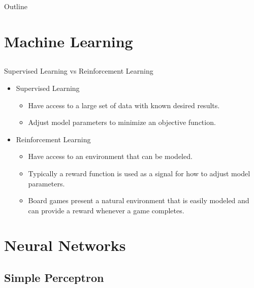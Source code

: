 


\begin{frame}[plain] 
\titlepage
\end{frame}

\begin{frame}[plain]{Outline}
\tableofcontents
\end{frame}

\section{Machine Learning}
\subsection{}

\begin{frame}{Supervised Learning vs Reinforcement Learning}
\begin{itemize}
\item Supervised Learning
\begin{itemize}
\item Have access to a large set of data with known desired results.
\item Adjust model parameters to minimize an objective function.
\end{itemize}
\item Reinforcement Learning
\begin{itemize}
\item Have access to an environment that can be modeled.
\item Typically a reward function is used as a signal for how to adjust model parameters.
\item Board games present a natural environment that is easily modeled and can provide a reward whenever a game completes.
\end{itemize}
\end{itemize}
\end{frame}

\section{Neural Networks}
\subsection{Simple Perceptron}

